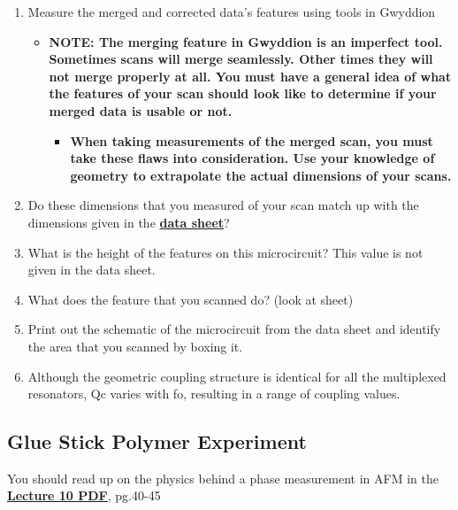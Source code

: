 \documentclass{../lab}
\begin{document}
\begin{enumerate}
    \item Measure the merged and corrected data's features using tools in Gwyddion

    \begin{itemize}
        \item \textbf{NOTE: The merging feature in Gwyddion is an imperfect tool.  Sometimes scans will merge seamlessly. Other times they will not merge properly at all. You must have a general idea of what the features of your scan should look like to determine if your merged data is usable or not.}
        \begin{itemize}
            \item \textbf{When taking measurements of the merged scan, you must take these flaws into consideration.  Use your knowledge of geometry to extrapolate the actual dimensions of your scans.}
        \end{itemize}

    \end{itemize}

    \item Do these dimensions that you measured of your scan match up with the dimensions given in the \href{http://experimentationlab.berkeley.edu/sites/default/files/AFMImages/CSQ\_Resonators\_1July2011\%20.pdf}{\textbf{data sheet}}?

    \item What is the height of the features on this microcircuit?  This value is not given in the data sheet.

    \item What does the feature that you scanned do? (look at sheet)

    \item Print out the schematic of the microcircuit from the data sheet and identify the area that you scanned by boxing it.

    \item Although the geometric coupling structure is identical for all the multiplexed resonators, Qc varies with fo, resulting in a range of coupling values.

\end{enumerate}

\subsection{Glue Stick Polymer Experiment}
\label{subsec:GlueStick}

You should read up on the physics behind a phase measurement in AFM in the \href{http://experimentationlab.berkeley.edu/sites/default/files/AFMImages/Lecture\_10\_AFM.pdf}{\textbf{Lecture 10 PDF}}, pg.40-45
\end{document}

